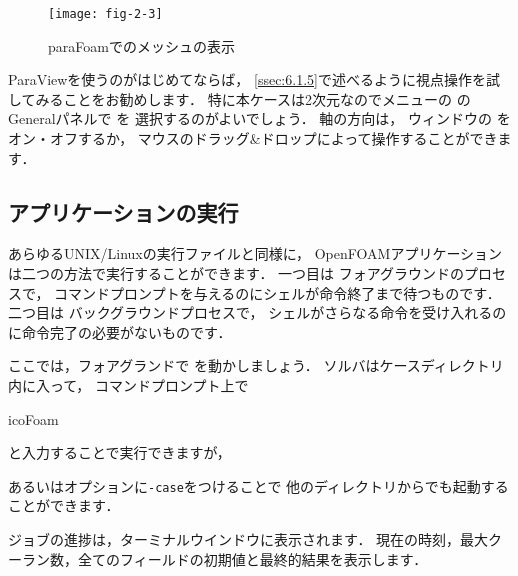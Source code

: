 \begin{figure}[ht]
 \texttt{[image: fig-2-3]}
 \caption{paraFoamでのメッシュの表示}
 \label{fig:2.3}
\end{figure}


ParaViewを使うのがはじめてならば，
\autoref{ssec:6.1.5}で述べるように視点操作を試してみることをお勧めします．
特に本ケースは2次元なのでメニューの
%
%
のGeneralパネルで
%
%
を
選択するのがよいでしょう．
軸の方向は，
%
%
ウィンドウの
%
%
をオン・オフするか，
マウスのドラッグ\&ドロップによって操作することができます．


\subsection{アプリケーションの実行}
\label{ssec:2.1.3}
あらゆるUNIX/Linuxの実行ファイルと同様に，
OpenFOAMアプリケーションは二つの方法で実行することができます．
一つ目は
%
%
フォアグラウンドのプロセスで，
コマンドプロンプトを与えるのにシェルが命令終了まで待つものです．
二つ目は
%
%
バックグラウンドプロセスで，
シェルがさらなる命令を受け入れるのに命令完了の必要がないものです．

ここでは，フォアグランドで
%
%
を動かしましょう．
ソルバはケースディレクトリ内に入って，
コマンドプロンプト上で
\begin{OFverbatim}[terminal]
icoFoam
\end{OFverbatim}
と入力することで実行できますが，

あるいはオプションに\texttt{-case}をつけることで
他のディレクトリからでも起動することができます．
ジョブの進捗は，ターミナルウインドウに表示されます．
現在の時刻，最大クーラン数，全てのフィールドの初期値と最終的結果を表示します．


